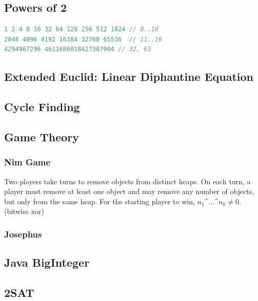 \documentclass[a4paper,landscape,8pt]{article}
\begin{document}
\begin{multicols}{2}
\subsection{Powers of 2}
\begin{lstlisting}[language=C++]
1 2 4 8 16 32 64 128 256 512 1024 // 0..10
2048 4096 8192 16384 32768 65536  // 11..16
4294967296 4611686018427387904 // 32, 63
\end{lstlisting}

\subsection{Extended Euclid: Linear Diphantine Equation}


\subsection{Cycle Finding}


\subsection{Game Theory}

\subsubsection{Nim Game}

Two players take turns to remove objects from distinct heaps. On each turn, a player must remove at least one object and may remove any number of objects, but only from the same heap. For the starting player to win, $n_1 \text{\textasciicircum{}} ... \text{\textasciicircum{}} n_k \neq 0$. (bitwise xor)

\subsubsection{Josephus}



\subsection{Java BigInteger}





\subsection{2SAT}


\end{multicols}
\end{document}
